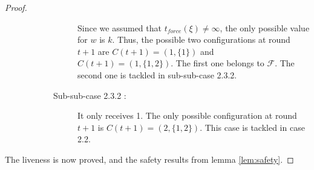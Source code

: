 \documentclass{article}
\begin{document}
\begin{proof}
\begin{description}
\begin{description}
\begin{description}
							Since we assumed that $t_{force}(\xi) \neq \infty$, the only possible value for $w$ is $k$.
							Thus, the possible two configurations at round $t+1$ are $C(t+1) = (1, \{1\})$ and $C(t+1) = (1, \{1, 2\})$.
							The first one belongs to $\mathcal{F}$. The second one is tackled in sub-sub-case 2.3.2.
						\item[Sub-sub-case 2.3.2 : ] It only receives 1.
							The only possible configuration at round $t+1$ is $C(t+1) = (2, \{1, 2\})$.
							This case is tackled in case 2.2.
					\end{description}
			\end{description}
	\end{description}
	The liveness is now proved, and the safety results from lemma \ref{lem:safety}.
\end{proof}

\printbibliography
\end{document}
